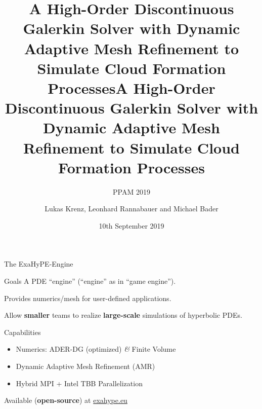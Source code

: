 \documentclass[aspectratio=169]{beamer}
\title[DG w/ AMR for Cloud Simulation]{A High-Order Discontinuous Galerkin Solver with Dynamic Adaptive Mesh Refinement to Simulate Cloud Formation Processes}
\title[High-Order DG with Dynamic AMR to Simulate Clouds]{A High-Order Discontinuous Galerkin Solver with Dynamic Adaptive Mesh Refinement to Simulate Cloud Formation Processes}
\subtitle[PPAM]{PPAM 2019}
\author[Krenz, Rannabauer, Bader]{Lukas Krenz, Leonhard Rannabauer and Michael Bader}
\date{10th September 2019}
\institute{Technical University of Munich}
\begin{document}
\maketitle
\begin{frame}{The ExaHyPE-Engine}
  \begin{block}{Goals}
   A PDE \enquote{engine} (\enquote{engine} as in \enquote{game engine}).

   Provides numerics/mesh for user-defined applications.

   Allow \textbf{smaller} teams to realize \textbf{large-scale} simulations of hyperbolic PDEs.
  \end{block}
  \begin{block}{Capabilities}
    \begin{itemize}
    \item Numerics: ADER-DG (optimized) \textit{\&} Finite Volume
    \item Dynamic Adaptive Mesh Refinement (AMR)
    \item Hybrid MPI + Intel TBB Parallelization
    \end{itemize}
  \end{block}

  Available (\textbf{open-source}) at \url{exahype.eu}
\end{frame}
\end{document}

